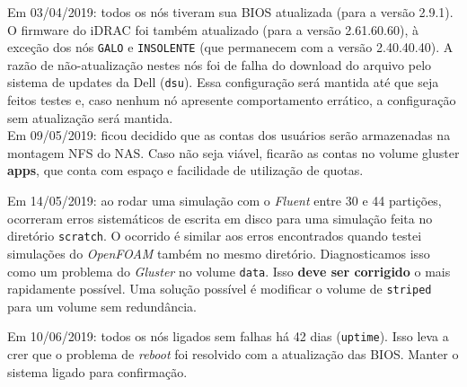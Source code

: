 
Em 03/04/2019: todos os nós tiveram sua BIOS atualizada (para a versão 2.9.1). O firmware do iDRAC foi também atualizado (para a versão 2.61.60.60), à exceção dos nós \texttt{GALO} e \texttt{INSOLENTE} (que permanecem com a versão 2.40.40.40). A razão de não-atualização nestes nós foi de falha do download do arquivo pelo sistema de updates da Dell (\texttt{dsu}). Essa configuração será mantida 
até que seja feitos testes e, caso nenhum nó apresente comportamento errático, 
a configuração sem atualização será mantida.\\


Em 09/05/2019: ficou decidido que as contas dos usuários serão armazenadas na 
montagem NFS do NAS. Caso não seja viável, ficarão as contas no volume gluster 
\textbf{apps}, que conta com espaço e facilidade de utilização de quotas.

Em 14/05/2019: ao rodar uma simulação com o \textit{Fluent} entre 30 e 44 partições, ocorreram erros sistemáticos de escrita em disco para uma simulação 
feita no diretório \texttt{scratch}. O ocorrido é similar aos erros encontrados 
quando testei simulações do \textit{OpenFOAM} também no mesmo diretório. 
Diagnosticamos isso como um problema do \textit{Gluster} no volume \texttt{data}.
Isso \textbf{deve ser corrigido} o mais rapidamente possível. Uma solução possível 
é modificar o volume de \texttt{striped} para um volume sem redundância.

Em 10/06/2019: todos os nós ligados sem falhas há 42 dias (\texttt{uptime}).
Isso leva a crer que o problema de \textit{reboot} foi resolvido com a
atualização das BIOS. Manter o sistema ligado para confirmação.


